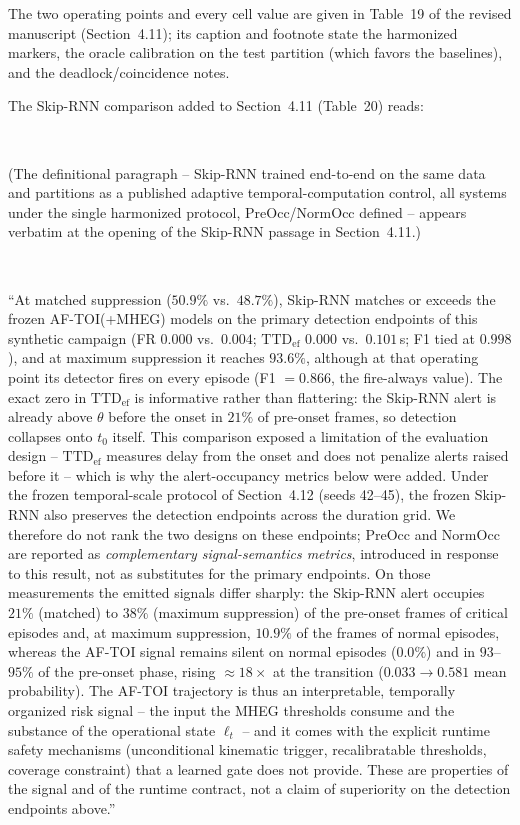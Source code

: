 \documentclass[1p,12pt,authoryear]{elsarticle}
\begin{document}
\vspace{2mm}
\noindent The two operating points and every cell value are given in Table~19 of the revised manuscript (Section~4.11); its caption and footnote state the harmonized markers, the oracle calibration on the test partition (which favors the baselines), and the deadlock/coincidence notes.

The Skip-RNN comparison added to Section~4.11 (Table~20) reads:

~

(The definitional paragraph -- Skip-RNN trained end-to-end on the same data and partitions as a published adaptive temporal-computation control, all systems under the single harmonized protocol, PreOcc/NormOcc defined -- appears verbatim at the opening of the Skip-RNN passage in Section~4.11.)

~

``At matched suppression ($50.9\%$ vs.\ $48.7\%$), Skip-RNN matches or exceeds the frozen AF-TOI(+MHEG) models on the primary detection endpoints of this synthetic campaign (FR $0.000$ vs.\ $0.004$; $\mathrm{TTD}_{\mathrm{ef}}$ $0.000$ vs.\ $0.101$\,s; F1 tied at $0.998$), and at maximum suppression it reaches $93.6\%$, although at that operating point its detector fires on every episode (F1 $=0.866$, the fire-always value). The exact zero in $\mathrm{TTD}_{\mathrm{ef}}$ is informative rather than flattering: the Skip-RNN alert is already above $\theta$ before the onset in $21\%$ of pre-onset frames, so detection collapses onto $t_0$ itself. This comparison exposed a limitation of the evaluation design -- $\mathrm{TTD}_{\mathrm{ef}}$ measures delay from the onset and does not penalize alerts raised before it -- which is why the alert-occupancy metrics below were added. Under the frozen temporal-scale protocol of Section~4.12 (seeds 42--45), the frozen Skip-RNN also preserves the detection endpoints across the duration grid. We therefore do not rank the two designs on these endpoints; PreOcc and NormOcc are reported as \emph{complementary signal-semantics metrics}, introduced in response to this result, not as substitutes for the primary endpoints. On those measurements the emitted signals differ sharply: the Skip-RNN alert occupies $21\%$ (matched) to $38\%$ (maximum suppression) of the pre-onset frames of critical episodes and, at maximum suppression, $10.9\%$ of the frames of normal episodes, whereas the AF-TOI signal remains silent on normal episodes ($0.0\%$) and in $93$--$95\%$ of the pre-onset phase, rising ${\approx}18\times$ at the transition ($0.033 \rightarrow 0.581$ mean probability). The AF-TOI trajectory is thus an interpretable, temporally organized risk signal -- the input the MHEG thresholds consume and the substance of the operational state $\ell_t$ -- and it comes with the explicit runtime safety mechanisms (unconditional kinematic trigger, recalibratable thresholds, coverage constraint) that a learned gate does not provide. These are properties of the signal and of the runtime contract, not a claim of superiority on the detection endpoints above.''
\end{document}
